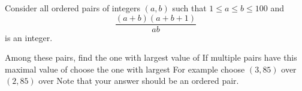 Consider all ordered pairs of integers $(a,b)$ such that $1\le a\le b\le 100$ and $$\frac{(a+b)(a+b+1)}{ab}$$is an integer.

Among these pairs, find the one with largest value of  If multiple pairs have this maximal value of  choose the one with largest  For example choose $(3,85)$ over $(2,85)$ over  Note that your answer should be an ordered pair.